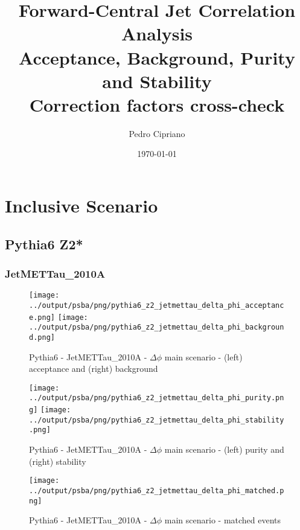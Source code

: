 \documentclass[11pt]{book}
\begin{document}
         
 
 \author{Pedro Cipriano}
 \date{\today}
 \title{Forward-Central Jet Correlation Analysis \\Acceptance, Background, Purity and Stability \\ Correction factors cross-check}

\maketitle

\tableofcontents

\newpage
\chapter{Inclusive Scenario}
\section{Pythia6 Z2*}
\subsection{JetMETTau\_2010A}

\begin{figure}[ht]
\centering
\texttt{[image: ../output/psba/png/pythia6\_z2\_jetmettau\_delta\_phi\_acceptance.png]}
\texttt{[image: ../output/psba/png/pythia6\_z2\_jetmettau\_delta\_phi\_background.png]}
\caption{Pythia6 - JetMETTau\_2010A - $\Delta\phi$ main scenario - (left) acceptance and (right) background}
\label{fig:p6_jetmettau_delta_phi_ab}
\end{figure}

\begin{figure}[ht]
\centering
\texttt{[image: ../output/psba/png/pythia6\_z2\_jetmettau\_delta\_phi\_purity.png]}
\texttt{[image: ../output/psba/png/pythia6\_z2\_jetmettau\_delta\_phi\_stability.png]}
\caption{Pythia6 - JetMETTau\_2010A - $\Delta\phi$ main scenario - (left) purity and (right) stability}
\label{fig:p6_jetmettau_delta_phi_ps}
\end{figure}

\begin{figure}[ht]
\centering
\texttt{[image: ../output/psba/png/pythia6\_z2\_jetmettau\_delta\_phi\_matched.png]}
\caption{Pythia6 - JetMETTau\_2010A - $\Delta\phi$ main scenario - matched events}
\label{fig:p6_jetmettau_delta_phi_matched}
\end{figure}
\end{document}
